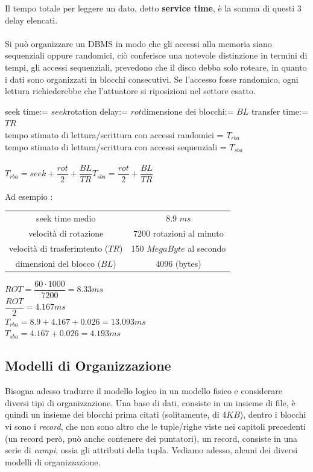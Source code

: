 \documentclass[12pt, letterpaper]{article}
\newcommand{\acc}{\\\hphantom{}\\}
\begin{document}
Il tempo totale per leggere un dato, detto \textbf{service time}, è la somma di questi 3 delay elencati.\acc 
Si può organizzare un DBMS in modo che gli accessi alla memoria siano sequenziali oppure randomici, ciò conferisce una 
notevole distinzione in termini di tempi, gli accessi sequenziali, prevedono che il disco debba solo roteare, in quanto 
i dati sono organizzati in blocchi consecutivi. Se l'accesso fosse randomico, ogni lettura richiederebbe che l'attuatore 
si riposizioni nel settore esatto.\begin{center}
    seek time:= \(seek\)\hphantom{aa}rotation delay:= \(rot\)\hphantom{aa}dimensione dei blocchi:= \(BL\)\hphantom{aa} transfer time:= \(TR\)
    \\ tempo stimato di lettura/scrittura con accessi randomici = \(T_{rba}\)\\  tempo stimato di lettura/scrittura con accessi sequenziali = \(T_{sba}\)\acc
    \(T_{rba}=seek+\dfrac{rot}{2}+\dfrac{BL}{TR}\)\hphantom{aaaaaaaa}\(T_{sba}=\dfrac{rot}{2}+\dfrac{BL}{TR}\)
\end{center}
Ad esempio : 
\begin{center}
    \begin{tabular}{cc}
        \rowcolor[HTML]{C0C0C0} 
        seek time medio                     & 8.9 \(ms\)                  \\
        \rowcolor[HTML]{EFEFEF} 
        velocità di rotazione               & 7200 rotazioni al minuto    \\
        \rowcolor[HTML]{C0C0C0} 
        velocità di trasferimtento (\(TR\)) & 150 \(MegaByte\) al secondo \\
        \rowcolor[HTML]{EFEFEF} 
        dimensioni del blocco (\(BL\))      & 4096 (bytes)               
        \end{tabular}
     
\end{center}
\(ROT=\dfrac{60\cdot 1000}{7200}=8.33ms\)\\
\(\dfrac{ROT}{2}=4.167ms\)\\
\(T_{rba}=8.9+4.167+0.026 = 13.093 ms\)\\ 
\(T_{sba}=4.167+0.026 = 4.193 ms\)
\subsection{Modelli di Organizzazione}
Bisogna adesso tradurre il modello logico in un modello fisico e considerare diversi tipi di organizzazione. Una base di dati, 
consiste in un insieme di file, è quindi un insieme dei blocchi prima citati (solitamente, di 4\(KB\)), dentro i blocchi vi sono 
i \textit{record}, che non sono altro che le tuple/righe viste nei capitoli precedenti (un record però, può anche contenere dei 
puntatori), un record, consiste in una serie di \textit{campi}, ossia gli attributi della tupla. Vediamo adesso, alcuni dei diversi modelli 
di organizzazione.
\end{document}
